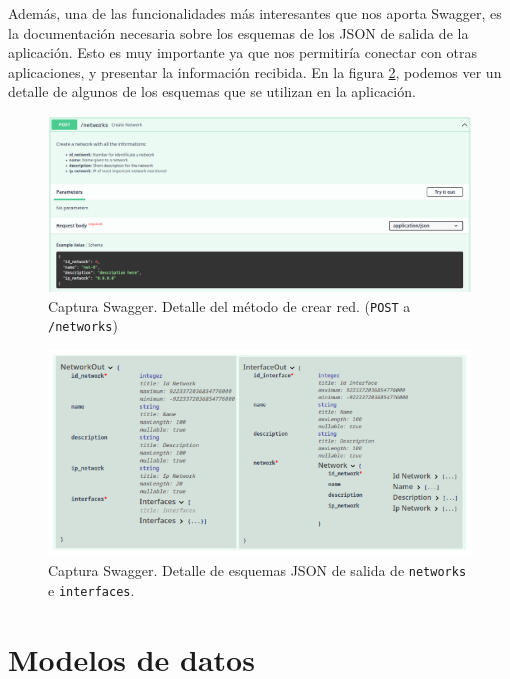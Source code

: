 \documentclass[a4paper, oneside, 12pt]{book}
\begin{document}
	\noindent Además, una de las funcionalidades más interesantes que nos aporta Swagger, es la documentación necesaria sobre los esquemas de los JSON de salida de la aplicación. Esto es muy importante ya que nos permitiría conectar con otras aplicaciones, y presentar la información recibida. En la figura \ref{img: swagger schemas 1}, podemos ver un detalle de algunos de los esquemas que se utilizan en la aplicación.
	
	\pagebreak
	
	\begin{figure}[h!]
		\includegraphics[width=1.2\textwidth, center]{img/swagger_2.png}
		\caption{Captura Swagger. Detalle del método de crear red. (\texttt{POST} a \texttt{/networks})}
		\label{img: swagger 2}
	\end{figure}

	\begin{figure}[h!]
		\includegraphics[width=1.2\textwidth, center]{img/swagger_schemas_1.png}
		\caption{Captura Swagger. Detalle de esquemas JSON de salida de \texttt{networks} e \texttt{interfaces}.}
		\label{img: swagger schemas 1}
	\end{figure}
	
	
	\pagebreak
	
	\section{Modelos de datos}
	
\end{document}
